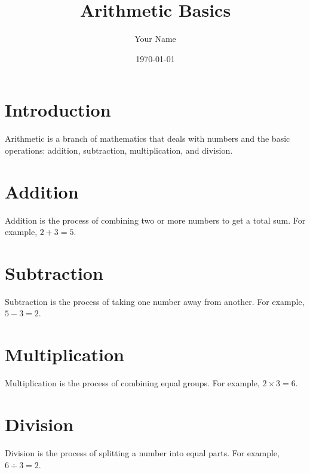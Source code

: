 \documentclass{article}
\title{Arithmetic Basics}
\author{Your Name}
\date{\today}
\begin{document}
\maketitle

\section{Introduction}
Arithmetic is a branch of mathematics that deals with numbers and the basic operations: addition, subtraction, multiplication, and division.

\section{Addition}
Addition is the process of combining two or more numbers to get a total sum. For example, \(2 + 3 = 5\).

\section{Subtraction}
Subtraction is the process of taking one number away from another. For example, \(5 - 3 = 2\).

\section{Multiplication}
Multiplication is the process of combining equal groups. For example, \(2 \times 3 = 6\).

\section{Division}
Division is the process of splitting a number into equal parts. For example, \(6 \div 3 = 2\).
\end{document}
